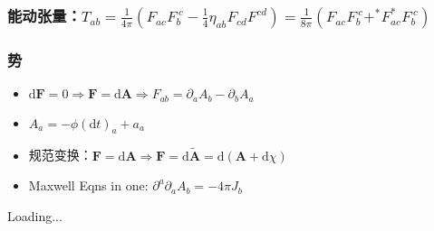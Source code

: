 \documentclass{article}
\begin{document}
\subsubsection{能动张量：$T_{ab}=\frac{1}{4\pi}(F_{ac}F_{b}^{\ c}-\frac{1}{4}\eta_{ab}F_{cd}F^{cd})=\frac{1}{8\pi}(F_{ac}F_{b}^{\ c}+^*F_{ac}^*F_{b}^{\ c})$}

\subsubsection{势}

\begin{itemize}
    \item $\mathrm{d}\boldsymbol{F}=0\Rightarrow\boldsymbol{F}=\mathrm{d}\boldsymbol{A}\Rightarrow F_{ab}=\partial_aA_b-\partial_bA_a$
    \item $A_a=-\phi(\mathrm{d}t)_a+a_a$
    \item 规范变换：$\boldsymbol{F}=\mathrm{d}\boldsymbol{A}\Rightarrow\boldsymbol{F}=\mathrm{d}\tilde{\boldsymbol{A}}=\mathrm{d}(\boldsymbol{A}+\mathrm{d}\chi)$
    \item Maxwell Eqns in one: $\partial^a\partial_aA_b=-4\pi J_b$
\end{itemize}

Loading...
\end{document}
